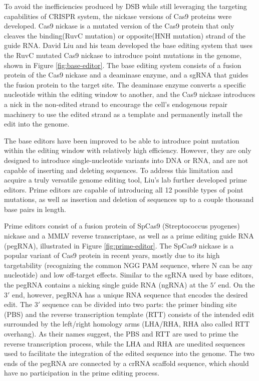 To avoid the inefficiencies produced by DSB while still leveraging the targeting capabilities of CRISPR system, the nickase versions of Cas9 proteins were developed. Cas9 nickase is a mutated version of the Cas9 protein that only cleaves the binding(RuvC mutation) or opposite(HNH mutation) strand of the guide RNA\cite{dasCRISPRBasedTherapeutics2022}. David Liu and his team developed the base editing system that uses the RuvC mutated Cas9 nickase to introduce point mutations in the genome, shown in Figure \ref{fig:base-editor}\cite{gaudelliProgrammableBaseEditing2017}. The base editing system consists of a fusion protein of the Cas9 nickase and a deaminase enzyme, and a sgRNA that guides the fusion protein to the target site. The deaminase enzyme converts a specific nucleotide within the editing window to another, and the Cas9 nickase introduces a nick in the non-edited strand to encourage the cell's endogenous repair machinery to use the edited strand as a template and permanently install the edit into the genome.

The base editors have been improved to be able to introduce point mutation within the editing window with relatively high efficiency\cite{portoBaseEditingAdvances2020}. However, they are only designed to introduce single-nucleotide variants into DNA or RNA, and are not capable of inserting and deleting sequences. To address this limitation and acquire a truly versatile genome editing tool, Liu's lab further developed prime editors\cite{liudavidr.SearchandreplaceGenomeEditing2019}. Prime editors are capable of introducing all 12 possible types of point mutations, as well as insertion and deletion of sequences up to a couple thousand base pairs in length\cite{linHighefficiencyPrimeEditing2021}. 

Prime editors consist of a fusion protein of SpCas9 (Streptococcus pyogenes) nickase and a MMLV reverse transcriptase, as well as a prime editing guide RNA (pegRNA), illustrated in Figure \ref{fig:prime-editor}. The SpCas9  nickase is a popular variant of Cas9 protein in recent years, mostly due to its high targetability (recognizing the common NGG PAM sequence, where N can be any nucleotide) and low off-target effects\cite{waltonUnconstrainedGenomeTargeting2020}. Similar to the sgRNA used by base editors, the pegRNA contains a nicking single guide RNA (ngRNA) at the $5'$ end. On the $3'$ end, however, pegRNA has a unique RNA sequence that encodes the desired edit. The $3'$ sequence can be divided into two parts: the primer binding site (PBS) and the reverse transcription template (RTT) consists of the intended edit surrounded by the left/right homology arms (LHA/RHA, RHA also called RTT overhang). As their names suggest, the PBS and RTT are used to prime the reverse transcription process, while the LHA and RHA are unedited sequences used to facilitate the integration of the edited sequence into the genome. The two ends of the pegRNA are connected by a crRNA scaffold sequence, which should have no participation in the prime editing process. 

